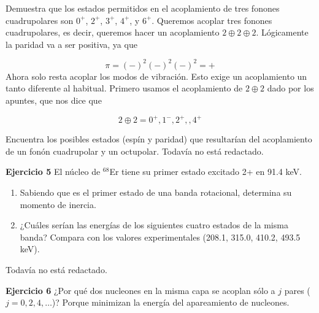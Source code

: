 \begin{texercise}
    Demuestra que los estados permitidos en el acoplamiento de tres fonones cuadrupolares son $0^+$, $2^+$, $3^+$, $4^+$, y $6^+$.
\tcblower
    Queremos acoplar tres fonones cuadrupolares, es decir, queremos hacer un acoplamiento $2\oplus 2\oplus 2$. Lógicamente la paridad va a ser positiva, ya que 

    \begin{equation}
        \pi = (-)^2 (-)^2 (-)^2 = +
    \end{equation}
    Ahora solo resta acoplar los modos de vibración. Esto exige un acoplamiento un tanto diferente al habitual. Primero usamos el acoplamiento de $2\oplus 2$ dado por los apuntes, que nos dice que 

    \begin{equation*}
        2 \oplus 2 = 0^+,1^-,2^+,,4^+
    \end{equation*}
    
\end{texercise}


\begin{texercise}
    Encuentra los posibles estados (espín y paridad) que resultarían del acoplamiento de un fonón cuadrupolar y un octupolar.
\tcblower
    Todavía no está redactado. 
\end{texercise}

\begin{texercise}
    \textbf{Ejercicio 5}
    El núcleo de $^{68}$Er tiene su primer estado excitado 2+ en 91.4 keV.
    \begin{enumerate}
        \item Sabiendo que es el primer estado de una banda rotacional, determina su momento de inercia.
        \item ¿Cuáles serían las energías de los siguientes cuatro estados de la misma banda? Compara con los valores experimentales (208.1, 315.0, 410.2, 493.5 keV).
    \end{enumerate}
\tcblower
Todavía no está redactado.
\end{texercise}

\begin{texercise}
    \textbf{Ejercicio 6}
    ¿Por qué dos nucleones en la misma capa se acoplan sólo a $j$ pares ($j = 0, 2, 4, \dots$)?
\tcblower
    Porque minimizan la energía del apareamiento de nucleones.
\end{texercise}

